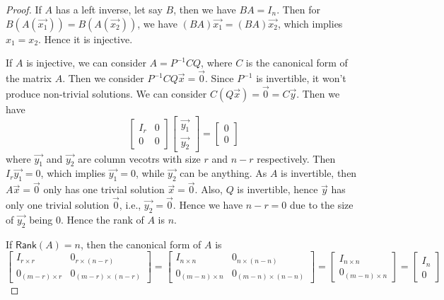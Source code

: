 \documentclass[
	11pt, %
	fleqn, %
	a4paper, %
]{LegrandOrangeBook}
\newcommand{\rank}[1]{\mathsf{Rank}(#1)} %
\begin{document}
\begin{proof}
    If $A$ has a left inverse, let say $B$, then we have $BA = I_n$. Then for $B(A(\vec{x_1})) = B(A(\vec{x_2}))$, we have $(BA)\vec{x_1} = (BA)\vec{x_2}$, which implies $x_1 = x_2$. Hence it is injective.

    If $A$ is injective, we can consider $A = P^{-1}CQ$, where $C$ is the canonical form of the matrix $A$. Then we consider $P^{-1}CQ\vec{x} = \vec{0}$. Since $P^{-1}$ is invertible, it won't produce non-trivial solutions. We can consider $C(Q\vec{x}) = \vec{0} = C\vec{y}$. Then we have 
    \[
        \begin{bmatrix}
            I_r & 0 \\
            0 & 0
        \end{bmatrix} \begin{bmatrix}
            \vec{y_1} \\
            \vec{y_2}
        \end{bmatrix} = \begin{bmatrix}
            0 \\
            0
        \end{bmatrix}
    \]
    where $\vec{y_1}$ and $\vec{y_2}$ are column vecotrs with size $r$ and $n - r$ respectively. Then $I_r \vec{y_1} = 0$, which implies $\vec{y_1} = 0$, while $\vec{y_2}$ can be anything. As $A$ is invertible, then $A\vec{x} = \vec{0}$ only has one trivial solution $\vec{x} = \vec{0}$. Also, $Q$ is invertible, hence $\vec{y}$ has only one trivial solution $\vec{0}$, i.e., $\vec{y_2} = \vec{0}$. Hence we have $n - r = 0$ due to the size of $\vec{y_2}$ being 0. Hence the rank of $A$ is $n$.

    If $\rank{A} = n$, then the canonical form of $A$ is 
    \[
        \begin{bmatrix}
            I_{r \times r} & 0_{r \times (n - r)} \\
            0_{(m - r) \times r} & 0_{(m - r) \times (n - r)}
        \end{bmatrix} = \begin{bmatrix}
            I_{n \times n} & 0_{n \times (n - n)} \\
            0_{(m - n) \times n} & 0_{(m - n) \times (n - n)}
        \end{bmatrix} = \begin{bmatrix}
            I_{n \times n} \\
            0_{(m - n) \times n}
        \end{bmatrix} = \begin{bmatrix}
            I_n \\
            0
        \end{bmatrix} 
    \]


\end{proof}
\end{document}

